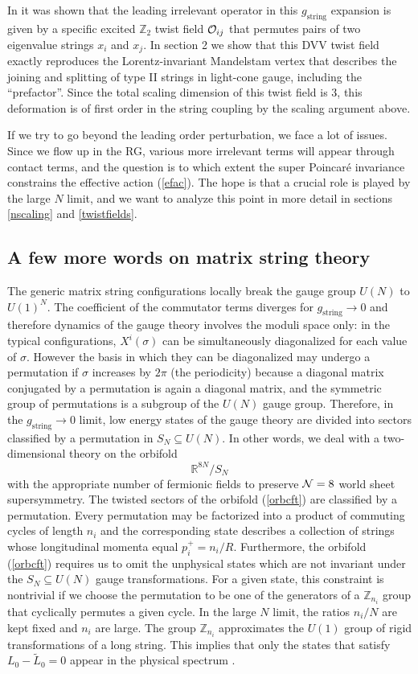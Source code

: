 \documentclass[nohyper,12pt,letterpaper]{JHEP3}
\def\IZ{{\mathbb Z}}           %
\def\IR{{\mathbb R}}
\def\calN{{\cal N}}
\def\calO{{\cal O}}
\def \tilde{\widetilde}
\def \eqref#1{(\ref{#1})}
\def \eqn#1#2{\begin{equation}#2\label{#1}\end{equation}}
\def \gs{g_{\mathrm{string}}}
\begin{document}
In \cite{dvv} it was shown that the leading irrelevant operator in this 
$\gs$ expansion is given by a specific excited $\IZ_2$ twist field
$\calO_{ij}$ that permutes pairs of two eigenvalue strings $x_i$ and 
$x_j$. In section 2 we show that this DVV twist field exactly reproduces 
the Lorentz-invariant Mandelstam vertex that describes the joining and 
splitting of type II strings in light-cone gauge, including the 
``prefactor''. Since the total scaling dimension of this twist field is 
$3$, this deformation is of first order in the string coupling by the 
scaling argument above.

If we try to go beyond the leading order perturbation, we face a lot of 
issues. Since we flow up in the RG, various more irrelevant terms will 
appear through contact terms, and the question is to which extent the 
super Poincar\'e invariance constrains the effective action \eqref{efac}. 
The hope is that a crucial role is played by the large $N$ limit, and we 
want to analyze this point in more detail in sections \ref{nscaling} and 
\ref{twistfields}.

\subsection{A few more words on matrix string theory}

The generic matrix string configurations locally break the gauge group
$U(N)$ to $U(1)^N$. The coefficient of the commutator terms diverges
for $\gs\to 0$ and therefore dynamics of the gauge theory involves the
moduli space only: in the typical configurations, $X^i(\sigma)$ can be
simultaneously diagonalized for each value of $\sigma$. However the
basis in which they can be diagonalized may undergo a permutation if
$\sigma$ increases by $2\pi$ (the periodicity) because a diagonal
matrix conjugated by a permutation is again a diagonal matrix, and the
symmetric group of permutations is a subgroup of the $U(N)$ gauge
group. Therefore, in the $\gs\to 0$ limit, low energy states of the
gauge theory are divided into sectors classified by a permutation in
$S_N\subseteq U(N)$. In other words, we deal with a two-dimensional
theory on the orbifold
%
\eqn{orbcft}{\IR^{8N}/S_N}
%
with the appropriate number of fermionic fields to preserve $\calN=8$
world sheet supersymmetry. The twisted sectors of the orbifold
(\ref{orbcft}) are classified by a permutation. Every permutation may
be factorized into a product of commuting cycles of length $n_i$ and
the corresponding state describes a collection of strings whose
longitudinal momenta equal $p^+_i = n_i / R$. Furthermore, the
orbifold (\ref{orbcft}) requires us to omit the unphysical states
which are not invariant under the $S_N\subseteq U(N)$ gauge
transformations. For a given state, this constraint is nontrivial if
we choose the permutation to be one of the generators of a $\IZ_{n_i}$
group that cyclically permutes a given cycle. In the large $N$ limit,
the ratios $n_i/N$ are kept fixed and $n_i$ are large. The group
$\IZ_{n_i}$ approximates the $U(1)$ group of rigid transformations of
a long string. This implies that only the states that satisfy
$L_0-\tilde L_0=0$ appear in the physical spectrum \cite{dvv}.
\end{document}
